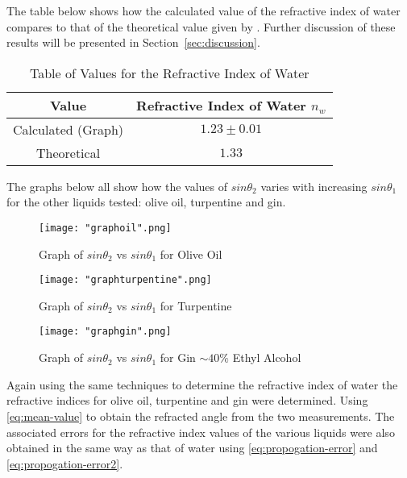 \documentclass{article}
\newcommand{\secref}[2][Section~]{#1\ref{#2}}
\begin{document}
\vspace{2mm}
\noindent
The table below shows how the calculated value of the refractive index of water compares to that of the theoretical value given by \cite{Web01}. Further discussion of these results will be presented in \secref{sec:discussion}.

\vspace{5mm}
\begin{table*}[h]
\centering %
\caption{Table of Values for the Refractive Index of Water}
\label{tab:table-water}
\begin{tabular}{|c|c|}
\hline
Value & Refractive Index of Water $n_w$ \\
\hline
Calculated (Graph) & $1.23 \pm 0.01$  \\
\hline
Theoretical \cite{Web01} & $1.33$ \\
\hline
\end{tabular}
\end{table*}

\newpage
\vspace{10mm}
\noindent
The graphs below all show how the values of $sin{\theta_2}$ varies with increasing $sin{\theta_1}$ for the other liquids tested: olive oil, turpentine and gin.


\vspace{20mm}
\begin{figure}[h]
\centering
\texttt{[image: "graphoil".png]}
\caption{Graph of $sin{\theta_2}$ vs $sin{\theta_1}$ for Olive Oil}
\label{fig:graph3}
\end{figure}

\begin{figure}[h]
\centering
\texttt{[image: "graphturpentine".png]}
\caption{Graph of $sin{\theta_2}$ vs $sin{\theta_1}$ for Turpentine}
\label{fig:graph4}
\end{figure}

\begin{figure}[h]
\centering
\texttt{[image: "graphgin".png]}
\caption{Graph of $sin{\theta_2}$ vs $sin{\theta_1}$ for Gin 	$\sim40\%$ Ethyl Alcohol}
\label{fig:graph5}
\end{figure}

\cleardoublepage
\vspace{2mm}
\noindent
Again using the same techniques to determine the refractive index of water the refractive indices for olive oil, turpentine and gin were determined. Using \eqref{eq:mean-value} to obtain the refracted angle from the two measurements. The associated errors for the refractive index values of the various liquids were also obtained in the same way as that of water using \eqref{eq:propogation-error} and \eqref{eq:propogation-error2}.
\end{document}
